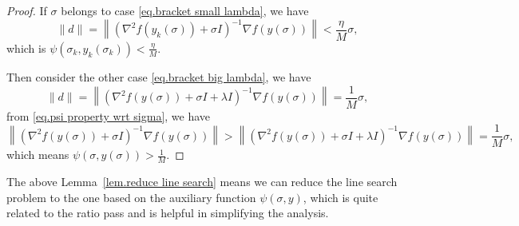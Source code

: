 \documentclass{mcom-l}
\numberwithin{equation}{section}
\begin{document}
\begin{proof}
    If $\sigma$ belongs to case \eqref{eq.bracket small lambda}, we have
    \begin{equation*}
        \|d\| = \left \|\left(\nabla^2 f(y_k(\sigma))+\sigma I\right)^{-1}\nabla f(y(\sigma))\right\|<\frac{\eta}{M}\sigma,
    \end{equation*}
    which is $\psi(\sigma_k,y_k(\sigma_k))<\frac{\eta}{M}$.

    Then consider the other case \eqref{eq.bracket big lambda}, we have
    \begin{equation*}
        \|d\| = \left \|\left(\nabla^2 f(y(\sigma))+\sigma I+\lambda I\right)^{-1}\nabla f(y(\sigma))\right\|=\frac{1}{M}\sigma,
    \end{equation*}
    from \eqref{eq.psi property wrt sigma}, we have
    \begin{equation*}
        \left \|\left(\nabla^2 f(y(\sigma))+\sigma I\right)^{-1}\nabla f(y(\sigma))\right\|>\left \|\left(\nabla^2 f(y(\sigma))+\sigma I+\lambda I\right)^{-1}\nabla f(y(\sigma))\right\|=\frac{1}{M}\sigma,
    \end{equation*}
    which means $\psi \left(\sigma,y(\sigma)\right)>\frac{1}{M}$.
\end{proof}
The above Lemma~\ref{lem.reduce line search} means we can reduce the line search problem to the one based on the auxiliary function $\psi(\sigma,y)$, which is quite related to the ratio pass and is helpful in simplifying the analysis.
\end{document}
